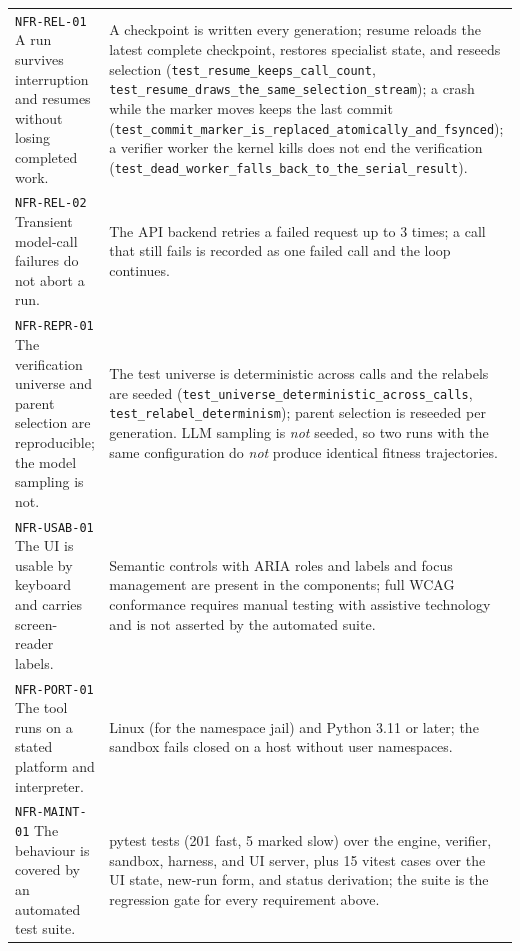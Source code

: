 \begin{longtable}{@{}>{\raggedright\arraybackslash}p{}>{\raggedright\arraybackslash}p{}@{}}
\texttt{NFR-REL-01} A run survives interruption and resumes without losing
completed work. & A checkpoint is written every generation; resume reloads the
latest complete checkpoint, restores specialist state, and reseeds selection
(\texttt{test\_resume\_keeps\_call\_count},
\texttt{test\_resume\_draws\_the\_same\_selection\_stream}); a crash while the
marker moves keeps the last commit
(\texttt{test\_commit\_marker\_is\_replaced\_atomically\_and\_fsynced}); a verifier worker the
kernel kills does not end the verification
(\texttt{test\_dead\_worker\_falls\_back\_to\_the\_serial\_result}). \\
\addlinespace[2pt]

\texttt{NFR-REL-02} Transient model-call failures do not abort a run. & The API
backend retries a failed request up to 3 times; a call that still fails is recorded
as one failed call and the loop continues. \\
\addlinespace[2pt]

\texttt{NFR-REPR-01} The verification universe and parent selection are
reproducible; the model sampling is not. & The test universe is deterministic
across calls and the relabels are seeded
(\texttt{test\_universe\_deterministic\_across\_calls},
\texttt{test\_relabel\_determinism}); parent selection is reseeded per generation.
LLM sampling is \emph{not} seeded, so two runs with the same configuration do
\emph{not} produce identical fitness trajectories. \\
\addlinespace[2pt]

\texttt{NFR-USAB-01} The UI is usable by keyboard and carries screen-reader
labels. & Semantic controls with ARIA roles and labels and focus management are
present in the components; full WCAG conformance requires manual testing with
assistive technology and is not asserted by the automated suite. \\
\addlinespace[2pt]

\texttt{NFR-PORT-01} The tool runs on a stated platform and interpreter. & Linux
(for the namespace jail) and Python 3.11 or later; the sandbox fails closed on a
host without user namespaces. \\
\addlinespace[2pt]

\texttt{NFR-MAINT-01} The behaviour is covered by an automated test suite. & 206
pytest tests (201 fast, 5 marked slow) over the engine, verifier, sandbox,
harness, and UI server, plus 15 vitest cases over the UI state, new-run form, and
status derivation; the suite is the regression gate for every requirement above. \\
\bottomrule
\end{longtable}
\endgroup

